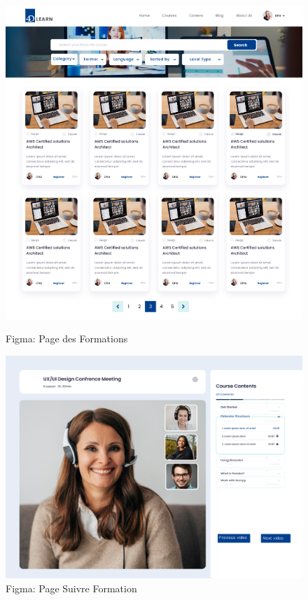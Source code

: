 \begin{figure}[H]
    \centering
    \begin{minipage}{0.45\textwidth}
        \centering
        \includegraphics[width=\textwidth]{Figures/explorer.PNG}
        \caption{Figma: Page des Formations}

    \end{minipage}
    \hfill
    \begin{minipage}{0.45\textwidth}
        \centering
        \includegraphics[width=\textwidth]{Figures/watchVideo.PNG}
        \caption{Figma: Page Suivre Formation }
        
    \end{minipage}
\end{figure}


